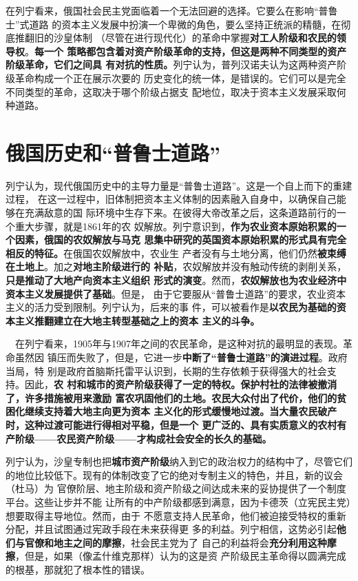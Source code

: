 在列宁看来，俄国社会民主党面临着一个无法回避的选择。它要么在影响“普鲁士”式道路
的资本主义发展中扮演一个卑微的角色，要么坚持正统派的精髓，在彻底推翻旧的沙皇体制
（尽管在进行现代化）的革命中掌握\textbf{对工人阶级和农民的领导权}。\textbf{每一个
  策略都包含着对资产阶级革命的支持，但这是两种不同类型的资产阶级革命，它们之间具
  有对抗的性质。}列宁认为，普列汉诺夫认为这两种资产阶级革命构成一个正在展示次要的
历史变化的统一体，是错误的。它们可以是完全不同类型的革命，这取决于哪个阶级占据支
配地位，取决于资本主义发展采取何种道路。

\section{俄国历史和“普鲁士道路”}

列宁认为，现代俄国历史中的主导力量是“普鲁士道路”。这是一个自上而下的重建过程，
在这一过程中，旧体制把资本主义体制的因素融入自身中，以确保自己能够在充满敌意的国
际环境中生存下来。在彼得大帝改革之后，这条道路前行的一个重大步骤，就是1861年的农
奴解放。列宁意识到，\textbf{作为农业资本原始积累的一个因素，俄国的农奴解放与马克
  思集中研究的英国资本原始积累的形式具有完全相反的特征。}在俄国农奴解放中，农业生
产者没有与土地分离，他们仍然\textbf{被束缚在土地上}。加之\textbf{对地主阶级进行的
  补贴}，农奴解放并没有触动传统的剥削关系，\textbf{只是推动了大地产向资本主义组织
  形式的演变}。然而，\textbf{农奴解放也为农业经济中资本主义发展提供了基础}。但是，
由于它要服从“普鲁士道路”的要求，农业资本主义的活力受到限制。列宁认为，后来的事
件，可以被看作是\textbf{以农民为基础的资本主义推翻建立在大地主转型基础之上的资本
  主义的斗争。}

　在列宁看来，1905年与1907年之间的农民革命，是这种对抗的最明显的表现。革命虽然因
镇压而失败了，但是，它进一步\textbf{中断了“普鲁士道路”的演进过程}。政府当局，特
别是政府首脑斯托雷平认识到，长期的生存依赖于获得强大的社会支持。因此，\textbf{农
  村和城市的资产阶级获得了一定的特权。保护村社的法律被撤消了，许多措施被用来激励
  富农巩固他们的土地。农民大众付出了代价，他们的贫困化继续支持着大地主向更为资本
  主义化的形式缓慢地过渡。当大量农民破产时，这种过渡可能进行得相对平稳，但是一个
  更广泛的、具有实质意义的农村有产阶级——农民资产阶级——才构成社会安全的长久的基础。}

列宁认为，沙皇专制也把\textbf{城市资产阶级}纳入到它的政治权力的结构中了，尽管它们
的地位比较低下。现有的体制改变了它的绝对专制主义的特色，并且，新的议会（杜马）为
官僚阶层、地主阶级和资产阶级之间达成未来的妥协提供了一个制度平台。这些让步并不能
让所有的中产阶级都感到满意，因为卡德茨（立宪民主党）想要取得主导地位。然而，由于
不愿意支持人民革命，他们被迫接受特权的重新分配，并且试图通过宪政手段在未来获得更
多的利益。列宁相信，这势必引起\textbf{他们与官僚和地主之间的摩擦}，社会民主党为了
自己的利益将会\textbf{充分利用这种摩擦}，但是，如果（像孟什维克那样）认为的这是资
产阶级民主革命得以圆满完成的根基，那就犯了根本性的错误。

